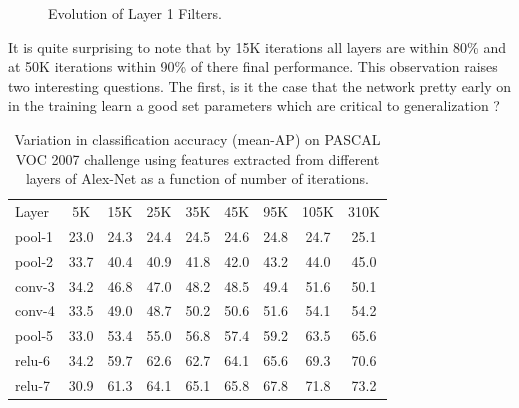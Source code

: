\documentclass[runningheads]{llncs}
\begin{document}
\begin{figure}
\caption{Evolution of Layer 1 Filters.}
\label{fig:conv1}
\end{figure}

It is quite surprising to note that by 15K iterations all layers are within 80\% and at 50K iterations within 90\% of there final performance. 
This observation raises two interesting questions. The first, is it the case that the network pretty early on in the training learn a good set parameters which are critical to generalization ?  


\setlength{\tabcolsep}{4pt}
\begin{table}
\begin{center}
\caption{Variation in classification accuracy (mean-AP) on PASCAL VOC 2007 challenge using features extracted from different layers of Alex-Net as a function of number of iterations.}
\label{table:headings}
\begin{tabular}{lcccccccc}
\hline\noalign{\smallskip}
Layer  & 5K & 15K & 25K & 35K & 45K & 95K & 105K & 310K \\
\noalign{\smallskip}
\hline
\noalign{\smallskip}
pool-1 & 23.0 & 24.3 & 24.4 & 24.5 & 24.6 & 24.8 & 24.7 & 25.1\\
pool-2 & 33.7 & 40.4 & 40.9 & 41.8 & 42.0 & 43.2 & 44.0 & 45.0\\
conv-3 & 34.2 & 46.8 & 47.0 & 48.2 & 48.5 & 49.4 & 51.6 & 50.1\\
conv-4 & 33.5 & 49.0 & 48.7 & 50.2 & 50.6 & 51.6 & 54.1 & 54.2\\
pool-5 & 33.0 & 53.4 & 55.0 & 56.8 & 57.4 & 59.2 & 63.5 & 65.6\\
relu-6 & 34.2 & 59.7 & 62.6 & 62.7 & 64.1 & 65.6 & 69.3 & 70.6\\
relu-7 & 30.9 & 61.3 & 64.1 & 65.1 & 65.8 & 67.8 & 71.8 & 73.2\\
\hline
\end{tabular}
\end{center}
\end{table}
\setlength{\tabcolsep}{1.4pt}
\end{document}
